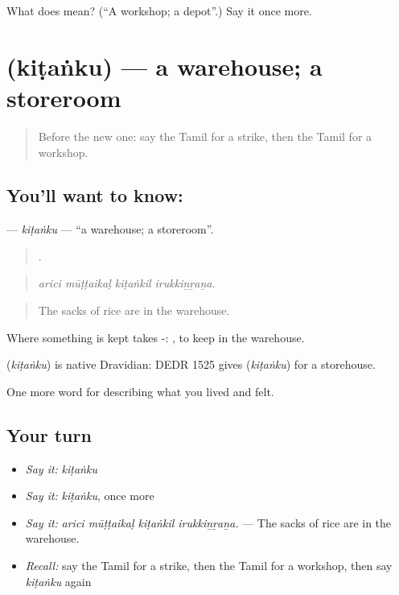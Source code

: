 \begin{tcolorbox}[breakable,colback=teal!4,colframe=teal!35!black,title={Before you move on}]
What does  mean? (\textquotedblleft{}A workshop; a depot\textquotedblright{}.) Say it once more.
\end{tcolorbox}
\section[\texorpdfstring{\ta{கிடங்கு} (kiṭaṅku)}{கிடங்கு (kiṭaṅku)}]{ (kiṭaṅku) — a warehouse; a storeroom}

\label{lesson:TA-C514-kitanku}



\begin{quote}
Before the new one: say the Tamil for a strike, then the Tamil for a workshop.
\end{quote}

\subsection*{You'll want to know: }
\textbf{} — \emph{kiṭaṅku} — \textquotedblleft{}a warehouse; a storeroom\textquotedblright{}.

\begin{quote}
   .
\end{quote}

\begin{quote}
\emph{arici mūṭṭaikaḷ kiṭaṅkil irukkiṉṟaṉa.}
\end{quote}

\begin{quote}
The sacks of rice are in the warehouse.
\end{quote}

Where something is kept takes -:  , to keep in the warehouse.

\begin{cousinweb}
\textbf{} (\emph{kiṭaṅku}) is native Dravidian: DEDR 1525 gives  (\emph{kiṭaṅku}) for a storehouse.
\end{cousinweb}

\begin{grammarlens}[title={What you've built}]
One more word for describing what you lived and felt.
\end{grammarlens}

\subsection*{Your turn}
\begin{itemize}
\raggedright
  \item \emph{Say it:} \emph{kiṭaṅku}
  \item \emph{Say it:} \emph{kiṭaṅku}, once more
  \item \emph{Say it:} \emph{arici mūṭṭaikaḷ kiṭaṅkil irukkiṉṟaṉa.} — The sacks of rice are in the warehouse.
  \item \emph{Recall:} say the Tamil for a strike, then the Tamil for a workshop, then say \emph{kiṭaṅku} again
\end{itemize}

